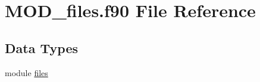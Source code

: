 \hypertarget{MOD__files_8f90}{\section{M\-O\-D\-\_\-files.\-f90 File Reference}
\label{MOD__files_8f90}
}
\subsection*{Data Types}
\begin{DoxyCompactItemize}
\item 
module \hyperlink{classfiles}{files}
\end{DoxyCompactItemize}
